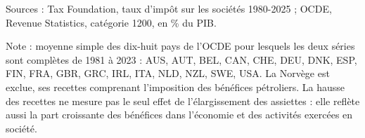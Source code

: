 Sources : Tax Foundation, taux d'impôt sur les sociétés 1980-2025 ; OCDE, Revenue Statistics, catégorie 1200, en \% du PIB.\par Note : moyenne simple des dix-huit pays de l'OCDE pour lesquels les deux séries sont complètes de 1981 à 2023 : AUS, AUT, BEL, CAN, CHE, DEU, DNK, ESP, FIN, FRA, GBR, GRC, IRL, ITA, NLD, NZL, SWE, USA. La Norvège est exclue, ses recettes comprenant l'imposition des bénéfices pétroliers. La hausse des recettes ne mesure pas le seul effet de l'élargissement des assiettes : elle reflète aussi la part croissante des bénéfices dans l'économie et des activités exercées en société.
